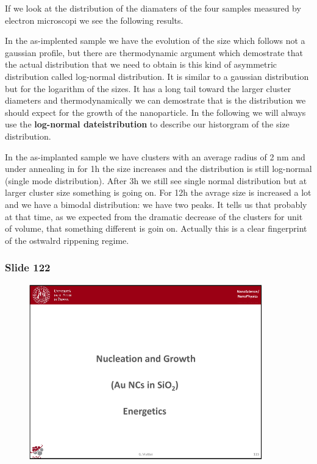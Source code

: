 \documentclass[../main/main.tex]{subfiles}
\begin{document}
 If we look at the distribution of the diamaters of the four samples measured by electron microscopi we see the following results.

 In the as-implented sample we have the evolution of the size which follows not a gaussian profile, but there are thermodynamic argument which demostrate that the actual distribution that we need to obtain is this kind of asymmetric distribution called log-normal distribution. It is similar to a gaussian distribution but for the logarithm of the sizes. It has a long tail toward the larger cluster diameters and thermodynamically we can demostrate that is the distribution we should expect for the growth of the nanoparticle.
 In the following we will always use the \textbf{log-normal dateistribution} to describe our historgram of the size distribution.

 In the as-implanted sample we have clusters with an average radius of 2 nm and under annealing in for 1h the size increases and the distribution is still log-normal (single mode distribution). After 3h we still see single normal distribution but at larger cluster size something is going on. For 12h the avrage size is increased a lot and we have a bimodal distribution: we have two peaks. It tells us that probably at that time, as we expected from the dramatic decrease of the clusters for unit of volume, that something different is goin on. Actually this is a clear fingerprint of the ostwalrd rippening regime.

\newpage

\subsubsection{Slide 122}

\begin{figure}[h!]
\centering
\includegraphics[page=8,width=0.9\textwidth]{../lessons/pdf_file/8_lesson.pdf}
\end{figure}
\end{document}
